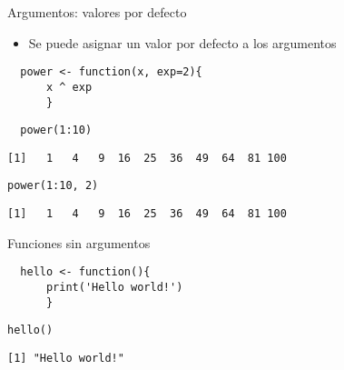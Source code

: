 \documentclass[xcolor={usenames,svgnames,dvipsnames}]{beamer}
\begin{document}
\begin{frame}[fragile,label={sec:orgheadline6}]{Argumentos: valores por defecto}
 \begin{itemize}
\item Se puede asignar un valor por defecto a los argumentos
\end{itemize}
\lstset{language=R,label= ,caption= ,captionpos=b,numbers=none}
\begin{lstlisting}
  power <- function(x, exp=2){
      x ^ exp
      }
\end{lstlisting}

\lstset{language=R,label= ,caption= ,captionpos=b,numbers=none}
\begin{lstlisting}
  power(1:10)
\end{lstlisting}

\begin{verbatim}
[1]   1   4   9  16  25  36  49  64  81 100
\end{verbatim}

\lstset{language=R,label= ,caption= ,captionpos=b,numbers=none}
\begin{lstlisting}
power(1:10, 2)
\end{lstlisting}

\begin{verbatim}
[1]   1   4   9  16  25  36  49  64  81 100
\end{verbatim}
\end{frame}

\begin{frame}[fragile,label={sec:orgheadline7}]{Funciones sin argumentos}
 \lstset{language=R,label= ,caption= ,captionpos=b,numbers=none}
\begin{lstlisting}
  hello <- function(){
      print('Hello world!')
      }
\end{lstlisting}

\lstset{language=R,label= ,caption= ,captionpos=b,numbers=none}
\begin{lstlisting}
hello()
\end{lstlisting}

\begin{verbatim}
[1] "Hello world!"
\end{verbatim}
\end{frame}
\end{document}
